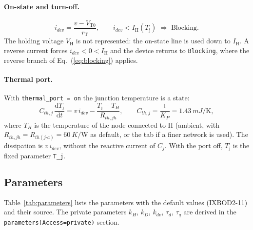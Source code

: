 \documentclass[11pt,a4paper]{article}
\newcommand{\Ih}{I_{\mathrm{H}}}
\newcommand{\Vh}{V_{\mathrm{H}}}
\newcommand{\Vto}{V_{\mathrm{T0}}}
\newcommand{\rT}{r_{\mathrm{T}}}
\newcommand{\Tj}{T_{\mathrm{j}}}
\newcommand{\ssc}[1]{\texttt{#1}}
\begin{document}
\paragraph{On-state and turn-off.}
\begin{equation}
i_{dev} = \frac{v - \Vto}{\rT}, \qquad i_{dev} < \Ih(\Tj) \;\Rightarrow\; \text{Blocking}.
\label{eq:on}
\end{equation}
The holding voltage $\Vh$ is not represented: the on-state line is used down to $\Ih$. A reverse current forces $i_{dev}<0<\Ih$ and the device returns to \ssc{Blocking}, where the reverse branch of Eq.~(\ref{eq:blocking}) applies.

\paragraph{Thermal port.} With \ssc{thermal\_port = on} the junction temperature is a state:
\begin{equation}
C_{th,j}\,\frac{\mathrm{d}\Tj}{\mathrm{d}t} = v\, i_{dev} - \frac{\Tj - T_H}{R_{th,jh}} ,
\qquad C_{th,j} = \frac{1}{K_P} = \SI{1.43}{mJ\per\kelvin} ,
\label{eq:thermal}
\end{equation}
where $T_H$ is the temperature of the node connected to H (ambient, with $R_{th,jh}=R_{th(j\text{-}a)}=\SI{60}{K\per\watt}$ as default, or the tab if a finer network is used). The dissipation is $v\,i_{dev}$, without the reactive current of $C_j$. With the port off, $\Tj$ is the fixed parameter \ssc{T\_j}.

\subsection{Parameters}
Table~\ref{tab:parameters} lists the parameters with the default values (IXBOD2-11) and their source. The private parameters $k_H$, $k_D$, $k_{dv}$, $\tau_d$, $\tau_q$ are derived in the \ssc{parameters(Access=private)} section.
\end{document}
